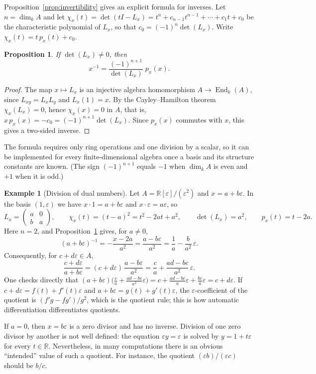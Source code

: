 \documentclass[12pt, a4paper]{report}
\theoremstyle{plain}
\newtheorem{proposition}[theorem]{Proposition}
\theoremstyle{definition}
\newtheorem{example}[theorem]{Example}
\theoremstyle{remark}
\theoremstyle{plain}
\newcommand{\RR}{\mathbb{R}}
\DeclareMathOperator{\End}{End}
\begin{document}
Proposition~\ref{prop:invertibility} gives an explicit formula for inverses. Let $n=\dim_kA$ and let $\chi_x(t)=\det(tI-L_x)=t^n+c_{n-1}t^{n-1}+\cdots+c_1t+c_0$ be the characteristic polynomial of $L_x$, so that $c_0=(-1)^n\det(L_x)$. Write $\chi_x(t)=t\,p_x(t)+c_0$.

\begin{proposition}\label{prop:inverse-formula}
If $\det(L_x)\neq0$, then
\[
  x^{-1}=\frac{(-1)^{n+1}}{\det(L_x)}\;p_x(x).
\]
\end{proposition}
\begin{proof}
The map $x\mapsto L_x$ is an injective algebra homomorphism $A\to\End_k(A)$, since $L_{xy}=L_xL_y$ and $L_x(1)=x$. By the Cayley--Hamilton theorem $\chi_x(L_x)=0$, hence $\chi_x(x)=0$ in $A$, that is, $x\,p_x(x)=-c_0=(-1)^{n+1}\det(L_x)$. Since $p_x(x)$ commutes with $x$, this gives a two-sided inverse.
\end{proof}

The formula requires only ring operations and one division by a scalar, so it can be implemented for every finite-dimensional algebra once a basis and its structure constants are known. (The sign $(-1)^{n+1}$ equals $-1$ when $\dim_kA$ is even and $+1$ when it is odd.)

\begin{example}[Division of dual numbers]\label{ex:dual-division}
Let $A=\RR[\varepsilon]/(\varepsilon^2)$ and $x=a+b\varepsilon$. In the basis $(1,\varepsilon)$ we have $x\cdot1=a+b\varepsilon$ and $x\cdot\varepsilon=a\varepsilon$, so
\[
  L_x=\begin{pmatrix}a&0\\ b&a\end{pmatrix},\qquad \chi_x(t)=(t-a)^2=t^2-2at+a^2,\qquad \det(L_x)=a^2,\qquad p_x(t)=t-2a .
\]
Here $n=2$, and Proposition~\ref{prop:inverse-formula} gives, for $a\neq0$,
\[
  (a+b\varepsilon)^{-1}=-\frac{x-2a}{a^2}=\frac{a-b\varepsilon}{a^2}=\frac1a-\frac{b}{a^2}\,\varepsilon .
\]
Consequently, for $c+d\varepsilon\in A$,
\[
  \frac{c+d\varepsilon}{a+b\varepsilon}=(c+d\varepsilon)\,\frac{a-b\varepsilon}{a^2}=\frac{c}{a}+\frac{ad-bc}{a^2}\,\varepsilon .
\]
One checks directly that $(a+b\varepsilon)\bigl(\tfrac ca+\tfrac{ad-bc}{a^2}\varepsilon\bigr)=c+\tfrac{ad-bc}{a}\varepsilon+\tfrac{bc}{a}\varepsilon=c+d\varepsilon$. If $c+d\varepsilon=f(t)+f'(t)\varepsilon$ and $a+b\varepsilon=g(t)+g'(t)\varepsilon$, the $\varepsilon$-coefficient of the quotient is $(f'g-fg')/g^2$, which is the quotient rule; this is how automatic differentiation differentiates quotients.

If $a=0$, then $x=b\varepsilon$ is a zero divisor and has no inverse. Division of one zero divisor by another is not well defined: the equation $\varepsilon y=\varepsilon$ is solved by $y=1+t\varepsilon$ for every $t\in\RR$. Nevertheless, in many computations there is an obvious ``intended'' value of such a quotient. For instance, the quotient $(\varepsilon b)/(\varepsilon c)$ should be $b/c$.
\end{example}
\end{document}
